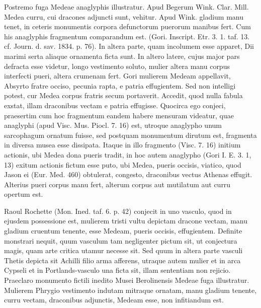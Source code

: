 \documentclass[a4paper, 11pt, oneside, polutonikogreek, german]{article}
\begin{document}
Postremo fuga Medeae anaglyphis illustratur. Apud Begerum Wink. Clar. Mill. Medea curru, cui dracones adjuncti sunt, vehitur. Apud Wink. gladium manu tenet, in ceteris monumentis corpora defunctorum puerorum manibus fert. Cum his anaglyphis fragmentum comparandum est. (Gori. Inscript. Etr. 3. 1. taf. 13. cf. Journ. d. sav. 1834. p. 76). In altera parte, quam incolumem esse apparet, Dii marimi serta aliaque ornamenta ficta sunt. In altero latere, cujus major pars defracta esse videtur, longo vestimento soluto, mulier altera manu corpus interfecti pueri, altera crumenam fert. Gori mulierem Medeam appellavit, Absyrto fratre occiso, pecunia rapta, e patria effugientem. Sed non intelligi potest, cur Medea corpus fratris secum portaverit. Accedit, quod nulla fabula exstat, illam draconibus vectam e patria effugisse. Quocirca ego conjeci, praesertim cum hoc fragmentum eandem habere mensuram videatur, quae anaglyphi (apud Visc. Mus. Piocl. 7. 16) est, utroque anaglypho unum sarcophagum ornatum fuisse, sed postquam monumentum dirutum est, fragmenta in diversa musea esse dissipata. Itaque in illo fragmento (Visc. 7. 16) initium actionis, ubi Medea dona pueris tradit, in hoc autem anaglypho (Gori I. E. 3. 1, 13) exitum actionis fictum esse puto, ubi Medea, pueris occisis, viatico, quod Jason ei (Eur. Med. 460) obtulerat, congesto, draconibus vectus Athenas effugit. Alterius pueri corpus manu fert, alterum corpus aut mutilatum aut curru opertum est.

Raoul Rochette (Mon. Ined. taf. 6. p. 42) conjecit in uno vasculo, quod in ejusdem possessione est, mulierem tristi vultu depictam dracone vectam, manu gladium cruentum tenente, esse Medeam, pueris occisis, effugientem. Definite monstrari nequit, quum vasculum tam negligenter pictum sit, ut conjectura magis, quam arte critica utamur necesse sit. Sed quum in altera parte vasculi Thetis depicta sit Achilli filio arma afferens, utraque autem mulier et in arca Cypseli et in Portlands-vasculo una ficta sit, illam sententiam non rejicio. Praeclaro monumento fictili inedito Musei Berolinensis Medeae fuga illustratur. Mulierem Phrygio vestimento indutam mitraque ornatam, manu gladium tenente, curru vectam, draconibus adjunctis, Medeam esse, non infitiandum est.
\end{document}
